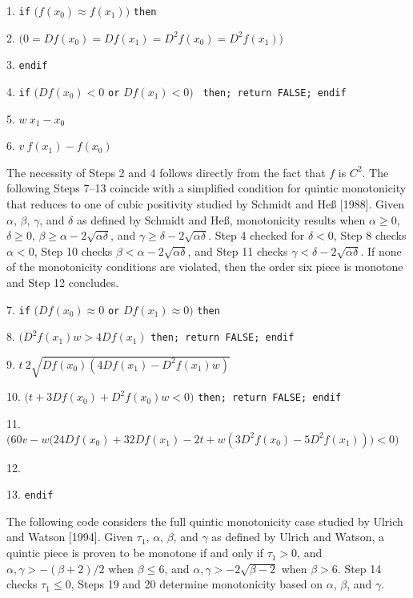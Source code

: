 {\parindent=6mm
\item{1.} {\tt if} $\bigl(f(x_0) \approx f(x_1)\bigr)$ {\tt then}
\item{2.}  $\bigl( 0 = Df(x_0) = Df(x_1)
  = D^2f(x_0) = D^2f(x_1) \bigr)$
\item{3.} {\tt endif}
\item{4.} {\tt if} $\bigl(Df(x_0) < 0$ {\tt or} $Df(x_1) < 0\bigr)$ {\tt
  then; return FALSE; endif}
\item{5.} $w \: x_1 - x_0$
\item{6.} $v \: f(x_1) - f(x_0)$

\item{} {The necessity of Steps 2 and 4 follows directly from
  the fact that $f$ is $C^2$. The following Steps 7--13 coincide with
  a simplified condition for quintic monotonicity that reduces to one
  of cubic positivity studied by Schmidt and He{\ss} [1988]. Given
  $\alpha$, $\beta$, $\gamma$, and $\delta$ as defined by Schmidt and
  He{\ss}, monotonicity results when $\alpha \geq 0$, $\delta \geq 0$,
  $\beta \geq \alpha - 2 \sqrt{\alpha \delta}$, and $\gamma \geq
  \delta - 2 \sqrt{\alpha \delta}$.  Step 4 checked for $\delta < 0$,
  Step 8 checks $\alpha < 0$, Step 10 checks $\beta < \alpha - 2
  \sqrt{\alpha \delta}$, and Step 11 checks $\gamma < \delta - 2
  \sqrt{\alpha \delta}$. If none of the monotonicity conditions are
  violated, then the order six piece is monotone and Step 12
  concludes.}

\item{7.} {\tt if} $\bigl(Df(x_0) \approx 0$ {\tt or} $Df(x_1) \approx
0\bigr)$ {\tt then}
\item{8.}  $\bigl(D^2f(x_1)w > 4Df(x_1)$ {\tt then;
return FALSE; endif}
\item{9.} \codent $t \: 2 \sqrt{Df(x_0) (4Df(x_1) - D^2f(x_1) w) }$
\item{10.}  $\bigl(t + 3Df(x_0) + D^2f(x_0)w < 0 \bigr)$
  {\tt then; return FALSE; endif}
\item{11.}  $\bigl(60v - w\bigl(24Df(x_0) + 32Df(x_1) - 2t
  + w(3D^2f(x_0) - 5D^2f(x_1))\bigr) < 0\bigr)$
\item{}   \codent {}
\item{12.} 
\item{13.} {\tt endif}

\item{} {The following code considers the full quintic monotonicity
case studied by Ulrich and Watson [1994]. Given $\tau_1$, $\alpha$,
$\beta$, and $\gamma$ as defined by Ulrich and Watson, a quintic
piece is proven to be monotone if and only if
$\tau_1 > 0$, and $\alpha, \gamma > -(\beta+2)/2$ when $\beta \leq 6$,
and $\alpha, \gamma > -2 \sqrt{\beta-2}$ when $\beta > 6$.
Step 14 checks $\tau_1 \le 0$, Steps 19 and 20 determine monotonicity based
on $\alpha$, $\beta$, and $\gamma$.}

}
